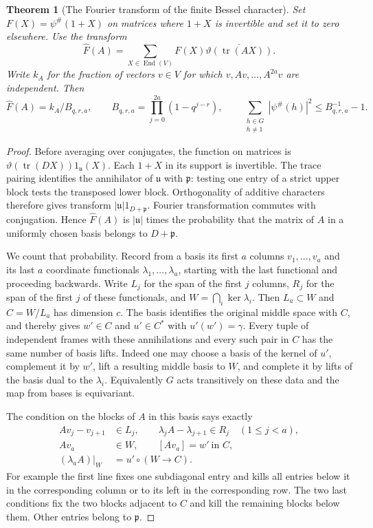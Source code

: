 \documentclass[a4paper,11pt]{article}
\newtheorem{theorem}[proposition]{Theorem}
\theoremstyle{definition}
\theoremstyle{remark}
\numberwithin{equation}{section}
\begin{document}
\begin{theorem}[The Fourier transform of the finite Bessel character]
\leavevmode\label{thm:besselfourier679}
Set \(F(X)=\psi^\#(1+X)\) on matrices where \(1+X\) is
invertible and set it to zero elsewhere. Use the transform
\[
       \widehat F(A)=\sum_{X\in\operatorname{End}(V)}
           F(X)\overline{\vartheta(\operatorname{tr}(AX))}.
\]
Write \(k_A\) for the fraction of vectors \(v\in V\) for which
\(v,Av,\ldots,A^{2a}v\) are independent. Then
\[
     \widehat F(A)=k_A/B_{q,r,a},\qquad
     B_{q,r,a}=\prod_{j=0}^{2a}(1-q^{j-r}),\qquad
     \sum_{\substack{h\in G\\h\ne1}}|\psi^\#(h)|^2
                      \le B_{q,r,a}^{-1}-1 .
\]
\end{theorem}
\begin{proof}
Before averaging over conjugates, the function on matrices is
\(\vartheta(\operatorname{tr}(DX))1_{\mathfrak u}(X)\).
Each \(1+X\) in its support is invertible. The trace pairing
identifies the annihilator of \(\mathfrak u\) with \(\mathfrak p\):
testing one entry of a strict upper block tests the transposed
lower block. Orthogonality of additive characters therefore
gives transform \(|\mathfrak u|1_{D+\mathfrak p}\).
Fourier transformation commutes with conjugation. Hence
\(\widehat F(A)\) is \(|\mathfrak u|\) times the probability
that the matrix of \(A\) in a uniformly chosen basis belongs
to \(D+\mathfrak p\).

We count that probability. Record from a basis its first \(a\)
columns \(v_1,\ldots,v_a\) and its last \(a\) coordinate
functionals \(\lambda_1,\ldots,\lambda_a\), starting with the
last functional and proceeding backwards. Write \(L_j\) for
the span of the first \(j\) columns, \(R_j\) for the span of
the first \(j\) of these functionals, and \(W=\bigcap_i\ker
\lambda_i\). Then \(L_a\subset W\) and \(C=W/L_a\) has
dimension \(c\). The basis identifies the original middle
space with \(C\), and thereby gives \(w'\in C\) and \(u'\in C^*\)
with \(u'(w')=\gamma\). Every tuple of independent frames with
these annihilations and every such pair in \(C\) has the same
number of basis lifts. Indeed one may choose a basis of the
kernel of \(u'\), complement it by \(w'\), lift a resulting
middle basis to \(W\), and complete it by lifts of the basis
dual to the \(\lambda_i\). Equivalently \(G\) acts transitively
on these data and the map from bases is equivariant.

The condition on the blocks of \(A\) in this basis says exactly
\[
 \begin{split}
 Av_j-v_{j+1}&\in L_j,\qquad
       \lambda_j A-\lambda_{j+1}\in R_j \quad(1\le j<a),\\
 Av_a&\in W,\qquad [Av_a]=w'\ \text{in } C,\\
 (\lambda_a A)|_W&=u'\circ(W\longrightarrow C).
 \end{split}
\]
For example the first line fixes one subdiagonal entry and
kills all entries below it in the corresponding column or
to its left in the corresponding row. The two last conditions
fix the two blocks adjacent to \(C\) and kill the remaining
blocks below them. Other entries belong to \(\mathfrak p\).


\end{proof}
\end{document}
